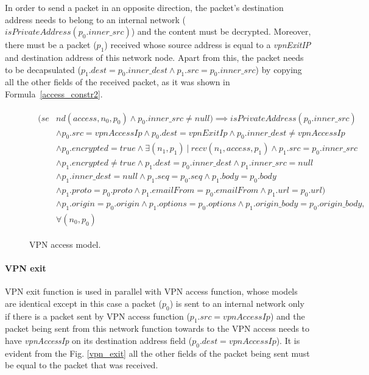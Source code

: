 In order to send a packet in an opposite direction, the packet's destination address needs to belong to an internal network ($isPrivateAddress(p_{0}.inner\_src)$) and the content must be decrypted. Moreover, there must be a packet ($p_1$) received whose source address is equal to a \textit{vpnExitIP} and destination address of this network node. Apart from this, the packet needs to be decapsulated ($p_{1}.dest =  p_{0}.inner\_dest\wedge p_{1}.src = p_{0}.inner\_src$) by copying all the other fields of the received packet, as it was shown in Formula~\ref{access_constr2}.

\begin{figure}[]
	{\footnotesize
		\begin{subequations}
			\begin{align}\
			\begin{split}
			\label{access_constr2}
			(se& nd(access, n_{0}, p_{0}) \wedge p_{0}.inner\_src \neq null) \implies isPrivateAddress(p_{0}.inner\_src) \\
			& \wedge p_{0}.src = vpnAccessIp \wedge p_{0}.dest = vpnExitIp \wedge p_{0}.inner\_dest \neq vpnAccessIp \\
			& \wedge p_{0}.encrypted = true \wedge \exists (n_{1}, p_{1}) \: | \: recv(n_{1}, access, p_{1}) \wedge p_{1}.src = p_{0}.inner\_src \\
			& \wedge p_{1}.encrypted \neq true \wedge p_{1}.dest =  p_{0}.inner\_dest \wedge p_{1}.inner\_src = null \\
			& \wedge p_{1}.inner\_dest = null \wedge p_{1}.seq = p_{0}.seq \wedge p_{1}.body = p_{0}.body \\
			& \wedge p_{1}.proto = p_{0}.proto \wedge p_{1}.emailFrom = p_{0}.emailFrom \wedge p_{1}.url = p_{0}.url) \\
			& \wedge p_{1}.origin = p_{0}.origin   \wedge p_{1}.options = p_{0}.options \wedge p_{1}.origin\_body = p_{0}.origin\_body , \\
			& \forall (n_{0}, p_{0})
			\end{split}
			\end{align}
		\end{subequations}
	}%
	\caption{VPN access model.}
	\label{vpn_access}
\end{figure}


\paragraph{VPN exit}
VPN exit function is used in parallel with VPN access function, whose models are identical except in this case a packet ($p_0$) is sent to an internal network only if there is a packet sent by VPN access function ($p_{1}.src = vpnAccessIp$) and the packet being sent from this network function towards to the VPN access needs to have \textit{vpnAccessIp} on its destination address field ($ p_{0}.dest = vpnAccessIp$). It is evident from the Fig. \ref{vpn_exit} all the other fields of the packet being sent must be equal to the packet that was received.


